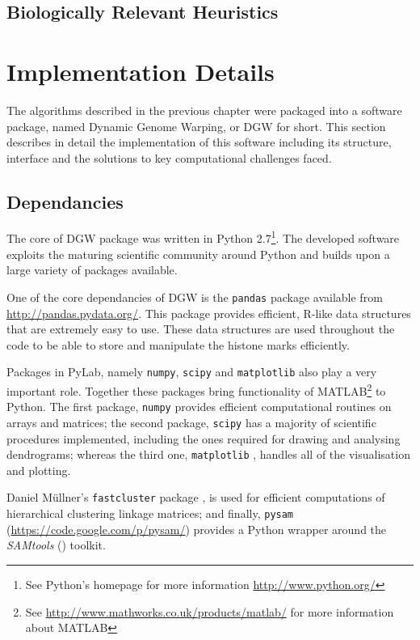 \documentclass[parskip]{cs4rep}
\newcommand{\pythonpackage}[1]{{\tt #1}}
\begin{document}
\section{Biologically Relevant Heuristics}

\chapter{Implementation Details}
The algorithms described in the previous chapter were packaged into a software package, named Dynamic Genome Warping, or DGW for short. This section describes in detail the implementation of this software including its structure, interface and the solutions to key computational challenges faced.

\section{Dependancies}
The core of DGW package was written in Python 2.7\footnote{See Python's homepage for more information \url{http://www.python.org/}}. The developed software exploits the maturing scientific community around Python and builds upon a large variety of packages available.

One of the core dependancies of DGW is the \verb"pandas" package available from \url{http://pandas.pydata.org/}. This package provides efficient, R-like data structures that are extremely easy to use. These data structures are used throughout the code to be able to store and manipulate the histone marks efficiently. 

Packages in PyLab, namely \pythonpackage{numpy}, \pythonpackage{scipy} and \pythonpackage{matplotlib} also play a very important role. Together these packages bring functionality of MATLAB\footnote{See \url{http://www.mathworks.co.uk/products/matlab/} for more information about MATLAB} to Python. The first package, \pythonpackage{numpy} provides efficient computational routines on arrays and matrices; the second package, \pythonpackage{scipy} has a majority of scientific procedures implemented, including the ones required for drawing and analysing dendrograms; whereas the third one, \pythonpackage{matplotlib} \cite{Hunter:2007ux}, handles all of the visualisation and plotting. 

Daniel M\"ullner's \pythonpackage{fastcluster} package \cite{Mullner:2011wb}, is used for efficient computations
of hierarchical clustering linkage matrices; and finally, \pythonpackage{pysam} (\url{https://code.google.com/p/pysam/}) provides a Python wrapper around the \emph{SAMtools} (\cite{Li:2009ka}) toolkit.
\end{document}
